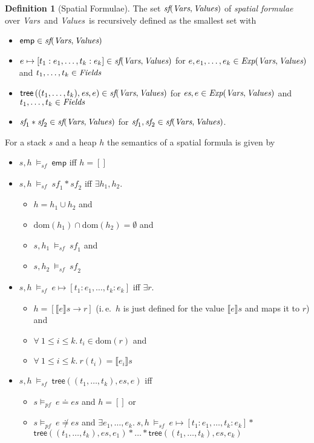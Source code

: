 \documentclass{scrartcl}
\theoremstyle{definition}
\newtheorem{definition}{Definition}
\newcommand{\pfequal}[2]{\ensuremath{#1 \doteq #2}}
\newcommand{\pfunequal}[2]{\ensuremath{#1 \not\doteq #2}}
\newcommand{\values}{{\emph{Values}}}
\newcommand{\vars}{{\emph{Vars}}}
\newcommand{\expr}{{\emph{Exp}}}
\newcommand{\fields}{{\emph{Fields}}}
\newcommand{\sfset}{{\emph{sf}}}
\newcommand{\modelspf}{{\models_{\textit{pf}}\ }}
\newcommand{\modelssf}{{\models_{\textit{sf}}\ }}
\newcommand{\sfemp}{{\textsf{emp}}}
\newcommand{\sftree}{{\textsf{tree}}}
\newcommand{\sfpointsto}[2]{#1 \mapsto [#2]}
\newcommand{\dom}{{\text{dom}}}
\begin{document}
\begin{definition}[Spatial Formulae]
  The set $\sfset(\vars,\values)$ of \emph{spatial formulae} over \vars\ and
  \values\ is recursively defined as the smallest set with
\begin{itemize}
\item $\sfemp \in \sfset(\vars,\values)$
\item $\sfpointsto{e}{t_1:e_1, \ldots, t_k:e_k} \in \sfset(\vars,\values)$ for
  $e, e_1, \ldots, e_k \in  \expr(\vars,\values)$ and $t_1, \ldots, t_k \in \fields$
\item $\sftree\left((t_1, \ldots, t_k),\textit{es},e\right) \in \sfset(\vars,\values)$
  for $\textit{es}, e \in \expr(\vars,\values)$ and\\$t_1, \ldots, t_k \in \fields$
\item $\textit{sf}_1 * \textit{sf}_2 \in \sfset(\vars,\values)$ for
  $\textit{sf}_1, \textit{sf}_2 \in \sfset(\vars,\values)$.
\end{itemize}
\bigskip
%
For a stack $s$ and a heap $h$ the semantics of a spatial formula is given by
\begin{itemize}
\item $s, h\ \modelssf \sfemp$ iff $h = []$
\item $s, h\ \modelssf \textit{sf}_1 * \textit{sf}_2$ iff $\exists h_1, h_2.$
  \begin{itemize}
  \item $h = h_1 \cup h_2$ and
  \item $\dom(h_1) \cap \dom(h_2) = \emptyset$ and
  \item $s, h_1\ \modelssf \textit{sf}_1$ and
  \item $s, h_2\ \modelssf \textit{sf}_2$
  \end{itemize}
\item $s, h\ \modelssf \sfpointsto{e}{t_1:e_1, \ldots, t_k:e_k}$ iff $\exists r.$
  \begin{itemize}
  \item $h = \left[ \llbracket e \rrbracket s \to r \right]$ (i.\,e.\ $h$ is
    just defined for the value $\llbracket e \rrbracket s$ and maps it to $r$) and
  \item $\forall\ 1 \leq i \leq k.\ t_i \in \dom(r)$ and
  \item $\forall\ 1 \leq i \leq k.\ r(t_i) = \llbracket e_i \rrbracket s$
  \end{itemize}
\item $s, h\ \modelssf \sftree\left((t_1, \ldots, t_k),\textit{es},e\right)$ iff
\begin{itemize}
  \item $s \modelspf \pfequal{e}{es}$ and $h = []$ or
  \item $s \modelspf \pfunequal{e}{es}$ and $\exists
  e_1, \ldots, e_k.\ s, h\ \modelssf \sfpointsto{e}{t_1:e_1, \ldots, t_k:e_k}
  *$\\$\sftree\left((t_1, \ldots, t_k),\textit{es},e_1\right) * \ldots * \sftree\left((t_1,
  \ldots, t_k),\textit{es},e_k\right)$
\end{itemize}
\end{itemize}
\end{definition}
\end{document}
